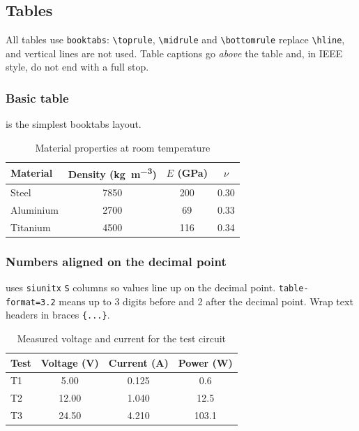 \subsection{Tables}

All tables use \texttt{booktabs}: \verb|\toprule|, \verb|\midrule| and
\verb|\bottomrule| replace \verb|\hline|, and vertical lines are not used.
Table captions go \emph{above} the table and, in IEEE style, do not end
with a full stop.

\subsubsection{Basic table}

 is the simplest booktabs layout.

\begin{table}[H]
    \centering
    \caption{Material properties at room temperature}
    \label{tab:basic}
    \begin{tabular}{lccc}
        \toprule
        Material  & Density (\unit{\kilo\gram\per\cubic\metre}) & $E$ (\unit{\giga\pascal}) & $\nu$ \\
        \midrule
        Steel     & 7850 & 200 & 0.30 \\
        Aluminium & 2700 & 69  & 0.33 \\
        Titanium  & 4500 & 116 & 0.34 \\
        \bottomrule
    \end{tabular}
\end{table}

\subsubsection{Numbers aligned on the decimal point}

 uses \texttt{siunitx} \texttt{S} columns so values line
up on the decimal point. \verb|table-format=3.2| means up to 3 digits before
and 2 after the decimal point. Wrap text headers in braces \verb|{...}|.

\begin{table}[H]
    \centering
    \caption{Measured voltage and current for the test circuit}
    \label{tab:siunitx}
    \begin{tabular}{
        l
        S[table-format=2.2]
        S[table-format=1.3]
        S[table-format=3.1]
    }
        \toprule
        {Test} & {Voltage (\unit{\volt})} & {Current (\unit{\ampere})} & {Power (\unit{\watt})} \\
        \midrule
        T1 & 5.00  & 0.125 & 0.6   \\
        T2 & 12.00 & 1.040 & 12.5  \\
        T3 & 24.50 & 4.210 & 103.1 \\
        \bottomrule
    \end{tabular}
\end{table}

